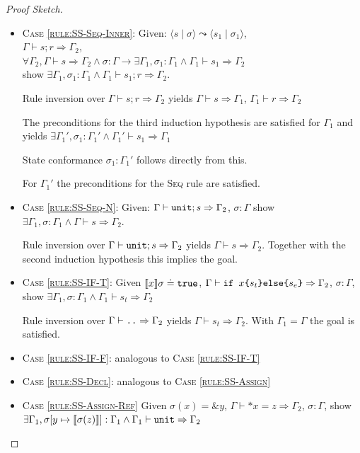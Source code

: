 \documentclass[twoside, english]{sdqthesis}
\newcommand{\tuple}[2]{\langle #1 \mid #2 \rangle}
\newcommand{\bbracket}[1]{\llbracket #1 \rrbracket}
\theoremstyle{definition}
\begin{document}
\begin{proof}[Proof Sketch]
\begin{itemize}
  \item \textsc{Case \cref{rule:SS-Seq-Inner}}:
    Given: $\tuple{s}{\sigma} \leadsto \tuple{s_1}{\sigma_1}$, \\
     $\Gamma \vdash s; r \Rightarrow \Gamma_2$, \\
     $\forall \Gamma_2, \Gamma \vdash s \Rightarrow \Gamma_2 \wedge \sigma : \Gamma \to \exists \Gamma_1, \sigma_1 : \Gamma_1 \wedge \Gamma_1 \vdash s_1 \Rightarrow \Gamma_2$ \\
    show $\exists \Gamma_1, \sigma_1 : \Gamma_1 \wedge \Gamma_1 \vdash s_1 ; r  \Rightarrow \Gamma_2$.

    Rule inversion over $\Gamma \vdash s; r \Rightarrow \Gamma_2$ yields $\Gamma \vdash s \Rightarrow \Gamma_1$, $\Gamma_1 \vdash r \Rightarrow \Gamma_2$

    The preconditions for the third induction hypothesis are satisfied for $\Gamma_1$ and yields
    $\exists \Gamma_1', \sigma_1 : \Gamma_1' \wedge \Gamma_1' \vdash s_1 \Rightarrow \Gamma_1$

    State conformance $\sigma_1 : \Gamma_1'$ follows directly from this.

    For $\Gamma_1'$ the preconditions for the \textsc{Seq} rule are satisfied.
  \item \textsc{Case \cref{rule:SS-Seq-N}}: 
    Given: $\Gamma \vdash \code{unit}; s \Rightarrow \Gamma_2$, $\sigma : \Gamma$
    show $\exists \Gamma_1, \sigma : \Gamma_1 \wedge \Gamma \vdash s \Rightarrow \Gamma_2$.

    Rule inversion over $\Gamma \vdash \code{unit}; s \Rightarrow \Gamma_2$ yields $\Gamma \vdash s \Rightarrow \Gamma_2$.
    Together with the second induction hypothesis this implies the goal.
  \item \textsc{Case \cref{rule:SS-IF-T}}:
     Given $\llbracket x \rrbracket \sigma \doteq \code{true}$, $\Gamma \vdash \code{if $x$\{$s_t$\}else\{$s_e$\}} \Rightarrow \Gamma_2$, $\sigma : \Gamma$, show $\exists \Gamma_1, \sigma : \Gamma_1 \wedge \Gamma_1 \vdash s_t \Rightarrow \Gamma_2$
    
    Rule inversion over $\Gamma \vdash \code{..} \Rightarrow \Gamma_2$ yields $\Gamma \vdash s_t \Rightarrow \Gamma_2$.
    With $\Gamma_1 = \Gamma$ the goal is satisfied.
  \item \textsc{Case \cref{rule:SS-IF-F}}: analogous to \textsc{Case \cref{rule:SS-IF-T}}
  \item \textsc{Case \cref{rule:SS-Decl}}: analogous to \textsc{Case \cref{rule:SS-Assign}}
  \item \textsc{Case \cref{rule:SS-Assign-Ref}}
    Given $ \sigma(x) = \&y $, $\Gamma \vdash *x = z \Rightarrow \Gamma_2$, $\sigma : \Gamma$, show
    $\exists \Gamma_1, \sigma[y \mapsto \bbracket{\sigma(z)}] : \Gamma_1 \wedge \Gamma_1 \vdash \code{unit} \Rightarrow \Gamma_2$


\end{itemize}
\end{proof}
\end{document}
